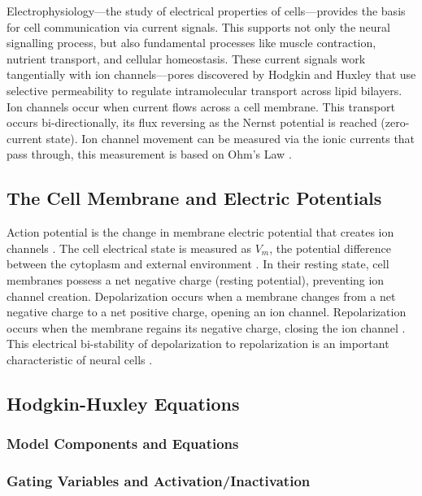 \documentclass{article} %
\begin{document}
\begin{multicols}{2}
Electrophysiology—the study of electrical properties of cells—provides the basis for cell communication via current signals. 
This supports not only the neural signalling process, but also fundamental processes like muscle contraction, nutrient transport, and cellular homeostasis. 
These current signals work tangentially with ion channels—pores discovered by Hodgkin and Huxley that use selective permeability to regulate intramolecular transport across lipid bilayers. 
Ion channels occur when current flows across a cell membrane. This transport occurs bi-directionally, its flux reversing as the Nernst potential is reached (zero-current state). 
Ion channel movement can be measured via the ionic currents that pass through, this measurement is based on Ohm's Law \citep{rubaiy2017electrophysiology}.

\subsection{The Cell Membrane and Electric Potentials}
\label{subsubsec:resting_potential}

Action potential is the change in membrane electric potential that creates ion channels \cite{rubaiy2017electrophysiology}. 
The cell electrical state is measured as $V_{m}$, the potential difference between the cytoplasm and external environment \cite{cervera2016bioelectrical}. 
In their resting state, cell membranes possess a net negative charge (resting potential), preventing ion channel creation. 
Depolarization occurs when a membrane changes from a net negative charge to a net positive charge, opening an ion channel. 
Repolarization occurs when the membrane regains its negative charge, closing the ion channel \cite{rubaiy2017electrophysiology}. 
This electrical bi-stability of depolarization to repolarization is an important characteristic of neural cells \cite{cervera2016bioelectrical}.

\subsection{Hodgkin-Huxley Equations}
\label{subsec:hodgekin_huxley}
\subsubsection{Model Components and Equations}
\label{subsubsec:hh_equations}
\subsubsection{Gating Variables and Activation/Inactivation}
\label{subsubsec:gating_variables}


\end{multicols}
\end{document}
